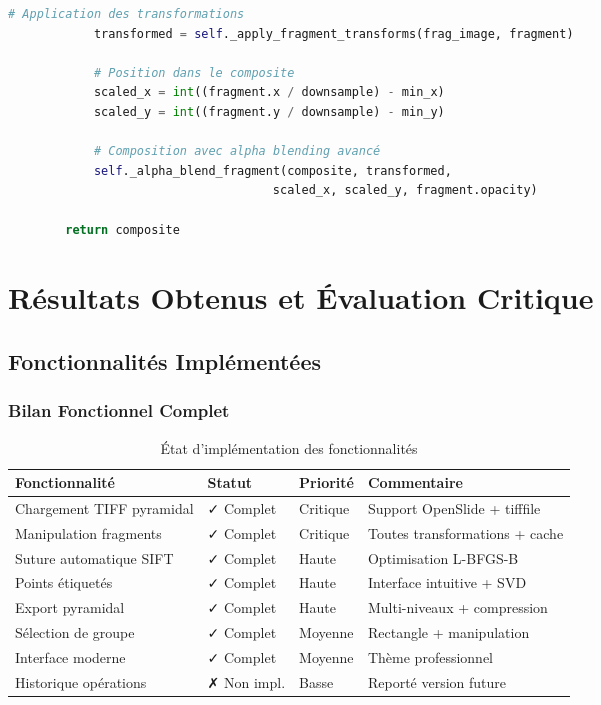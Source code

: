 \documentclass[12pt,a4paper]{report}
\begin{document}
\begin{lstlisting}[language=Python]
            # Application des transformations
            transformed = self._apply_fragment_transforms(frag_image, fragment)
            
            # Position dans le composite
            scaled_x = int((fragment.x / downsample) - min_x)
            scaled_y = int((fragment.y / downsample) - min_y)
            
            # Composition avec alpha blending avancé
            self._alpha_blend_fragment(composite, transformed, 
                                     scaled_x, scaled_y, fragment.opacity)
        
        return composite
\end{lstlisting}

\section{Résultats Obtenus et Évaluation Critique}

\subsection{Fonctionnalités Implémentées}

\subsubsection{Bilan Fonctionnel Complet}

\begin{table}[H]
\centering
\begin{tabular}{|p{4cm}|p{2cm}|p{2cm}|p{4cm}|}
\hline
\textbf{Fonctionnalité} & \textbf{Statut} & \textbf{Priorité} & \textbf{Commentaire} \\
\hline
Chargement TIFF pyramidal & ✓ Complet & Critique & Support OpenSlide + tifffile \\
\hline
Manipulation fragments & ✓ Complet & Critique & Toutes transformations + cache \\
\hline
Suture automatique SIFT & ✓ Complet & Haute & Optimisation L-BFGS-B \\
\hline
Points étiquetés & ✓ Complet & Haute & Interface intuitive + SVD \\
\hline
Export pyramidal & ✓ Complet & Haute & Multi-niveaux + compression \\
\hline
Sélection de groupe & ✓ Complet & Moyenne & Rectangle + manipulation \\
\hline
Interface moderne & ✓ Complet & Moyenne & Thème professionnel \\
\hline
Historique opérations & ✗ Non impl. & Basse & Reporté version future \\
\hline
\end{tabular}
\caption{État d'implémentation des fonctionnalités}
\end{table}
\end{document}
